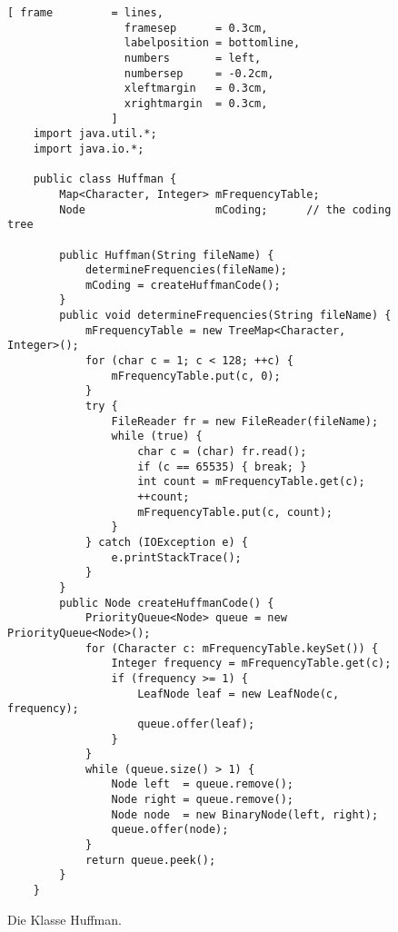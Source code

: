 \begin{figure}[!h]
\centering
\begin{Verbatim}[ frame         = lines, 
                  framesep      = 0.3cm, 
                  labelposition = bottomline,
                  numbers       = left,
                  numbersep     = -0.2cm,
                  xleftmargin   = 0.3cm,
                  xrightmargin  = 0.3cm,
                ]
    import java.util.*;
    import java.io.*;
    
    public class Huffman {
        Map<Character, Integer> mFrequencyTable;
        Node                    mCoding;      // the coding tree 
    
        public Huffman(String fileName) {
            determineFrequencies(fileName);
            mCoding = createHuffmanCode();
        }
        public void determineFrequencies(String fileName) {
            mFrequencyTable = new TreeMap<Character, Integer>();
            for (char c = 1; c < 128; ++c) {
                mFrequencyTable.put(c, 0);
            }
            try {
                FileReader fr = new FileReader(fileName);
                while (true) {
                    char c = (char) fr.read();
                    if (c == 65535) { break; }
                    int count = mFrequencyTable.get(c);
                    ++count;
                    mFrequencyTable.put(c, count);
                }
            } catch (IOException e) {
                e.printStackTrace();
            }
        }    
        public Node createHuffmanCode() {
            PriorityQueue<Node> queue = new PriorityQueue<Node>();
            for (Character c: mFrequencyTable.keySet()) {
                Integer frequency = mFrequencyTable.get(c);
                if (frequency >= 1) {
                    LeafNode leaf = new LeafNode(c, frequency);
                    queue.offer(leaf);
                }
            }
            while (queue.size() > 1) {
                Node left  = queue.remove();
                Node right = queue.remove();
                Node node  = new BinaryNode(left, right);
                queue.offer(node);
            }
            return queue.peek();
        }
    }
\end{Verbatim}
\vspace*{-0.3cm}
\caption{Die Klasse Huffman.}
\label{fig:Huffman.java}
\end{figure}

